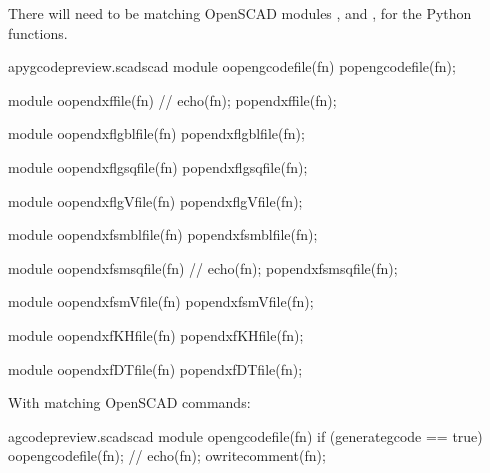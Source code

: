\documentclass{ltxdoc}
\begin{document}
There will need to be matching OpenSCAD modules 
, and
, 
for the Python functions.

\lstset{firstnumber=\thepyscad}
\begin{writecode}{a}{pygcodepreview.scad}{scad}
module oopengcodefile(fn) {
    popengcodefile(fn);
}

module oopendxffile(fn) {
//    echo(fn);
    popendxffile(fn);
}

module oopendxflgblfile(fn) {
    popendxflgblfile(fn);
}

module oopendxflgsqfile(fn) {
    popendxflgsqfile(fn);
}

module oopendxflgVfile(fn) {
    popendxflgVfile(fn);
}

module oopendxfsmblfile(fn) {
    popendxfsmblfile(fn);
}

module oopendxfsmsqfile(fn) {
//    echo(fn);
    popendxfsmsqfile(fn);
}

module oopendxfsmVfile(fn) {
    popendxfsmVfile(fn);
}

module oopendxfKHfile(fn) {
    popendxfKHfile(fn);
}

module oopendxfDTfile(fn) {
    popendxfDTfile(fn);
}

\end{writecode}
\addtocounter{pyscad}{42}

With matching OpenSCAD commands: %
 
\lstset{firstnumber=\thegcpscad}
\begin{writecode}{a}{gcodepreview.scad}{scad}
module opengcodefile(fn) {
if (generategcode == true) {
    oopengcodefile(fn);
//    echo(fn);
    owritecomment(fn);
    }
}

\end{writecode}
\addtocounter{gcpscad}{8}
\end{document}
